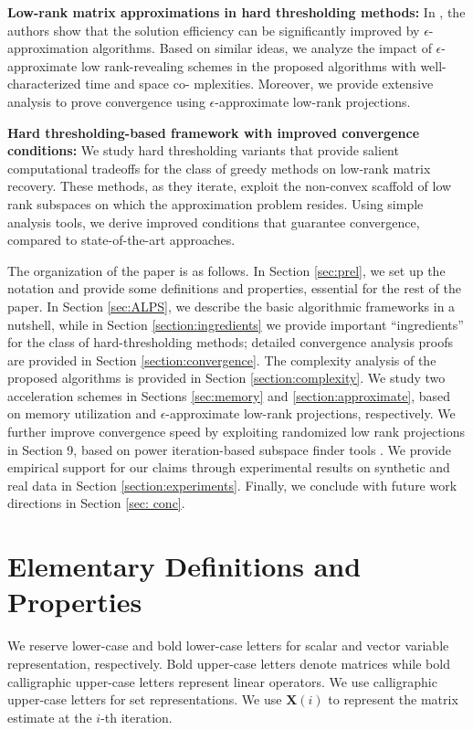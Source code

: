 \documentclass[twocolumn]{svjour3}
\newcommand{\signal}{\boldsymbol{X}}
\begin{document}
\textbf{Low-rank matrix approximations in hard thresholding methods:} 
In \cite{clash}, the authors show that the solution efficiency can be significantly improved by $\epsilon$-approximation algorithms. Based on similar ideas, we analyze the impact of $\epsilon$-approximate low rank-revealing schemes in the proposed algorithms with well-characterized time and space co- mplexities. Moreover, we provide extensive analysis to prove convergence using $\epsilon$-approximate low-rank projections.

\textbf{Hard thresholding-based framework with improved convergence conditions:} We study hard thresholding variants that provide salient computational tradeoffs for the class of greedy methods on low-rank matrix recovery. These methods, as they iterate, exploit the non-convex scaffold of low rank subspaces on which the approximation problem resides. Using simple analysis tools, we derive improved conditions that guarantee convergence, compared to state-of-the-art approaches. 

The organization of the paper is as follows. In Section \ref{sec:prel}, we set up the notation and provide some definitions and properties, essential for the rest of the paper. In Section \ref{sec:ALPS}, we describe the basic algorithmic frameworks in a nutshell, while in Section {\ref{section:ingredients}} we provide important ``ingredients'' for the class of hard-thresholding methods; detailed convergence analysis proofs are provided in Section \ref{section:convergence}. The complexity analysis of the proposed algorithms is provided in Section \ref{section:complexity}. We study two acceleration schemes in Sections \ref{sec:memory} and \ref{section:approximate}, based on memory utilization and $\epsilon$-approximate low-rank projections, respectively. We further improve convergence speed by exploiting randomized low rank projections in Section 9, based on power iteration-based subspace finder tools \cite{findingstructure}. We provide empirical support for our claims through experimental results on synthetic and real data in Section \ref{section:experiments}. Finally, we conclude with future work directions in Section \ref{sec: conc}.

\section{Elementary Definitions and Properties}{\label{sec:prel}}

We reserve lower-case and bold lower-case letters for scalar and vector variable representation, respectively. Bold upper-case letters denote matrices while bold calligraphic upper-case letters represent linear operators. We use calligraphic upper-case letters for set representations. We use $ \signal(i) $ to represent the matrix estimate at the $i$-th iteration. 
\end{document}
